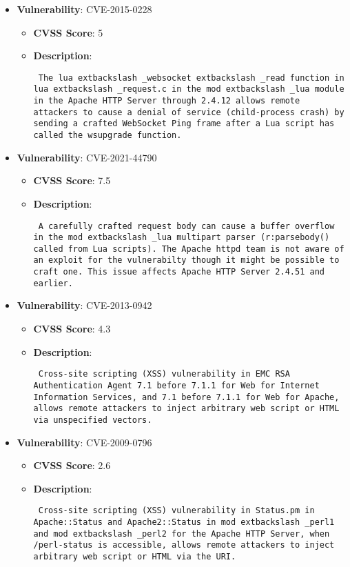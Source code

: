 \documentclass{article}
\begin{document}
\begin{itemize}
        \item \textbf{Vulnerability}: CVE-2015-0228
        \begin{itemize}
            \item \textbf{CVSS Score}:  5 
            \item \textbf{Description}: \parbox{\linewidth}{\texttt{ The lua	extbackslash _websocket	extbackslash _read function in lua	extbackslash _request.c in the mod	extbackslash _lua module in the Apache HTTP Server through 2.4.12 allows remote attackers to cause a denial of service (child-process crash) by sending a crafted WebSocket Ping frame after a Lua script has called the wsupgrade function. }}
        \end{itemize}
    
        \item \textbf{Vulnerability}: CVE-2021-44790
        \begin{itemize}
            \item \textbf{CVSS Score}:  7.5 
            \item \textbf{Description}: \parbox{\linewidth}{\texttt{ A carefully crafted request body can cause a buffer overflow in the mod	extbackslash _lua multipart parser (r:parsebody() called from Lua scripts). The Apache httpd team is not aware of an exploit for the vulnerabilty though it might be possible to craft one. This issue affects Apache HTTP Server 2.4.51 and earlier. }}
        \end{itemize}
    
        \item \textbf{Vulnerability}: CVE-2013-0942
        \begin{itemize}
            \item \textbf{CVSS Score}:  4.3 
            \item \textbf{Description}: \parbox{\linewidth}{\texttt{ Cross-site scripting (XSS) vulnerability in EMC RSA Authentication Agent 7.1 before 7.1.1 for Web for Internet Information Services, and 7.1 before 7.1.1 for Web for Apache, allows remote attackers to inject arbitrary web script or HTML via unspecified vectors. }}
        \end{itemize}
    
        \item \textbf{Vulnerability}: CVE-2009-0796
        \begin{itemize}
            \item \textbf{CVSS Score}:  2.6 
            \item \textbf{Description}: \parbox{\linewidth}{\texttt{ Cross-site scripting (XSS) vulnerability in Status.pm in Apache::Status and Apache2::Status in mod	extbackslash _perl1 and mod	extbackslash _perl2 for the Apache HTTP Server, when /perl-status is accessible, allows remote attackers to inject arbitrary web script or HTML via the URI. }}
        \end{itemize}
    

\end{itemize}
\end{document}
